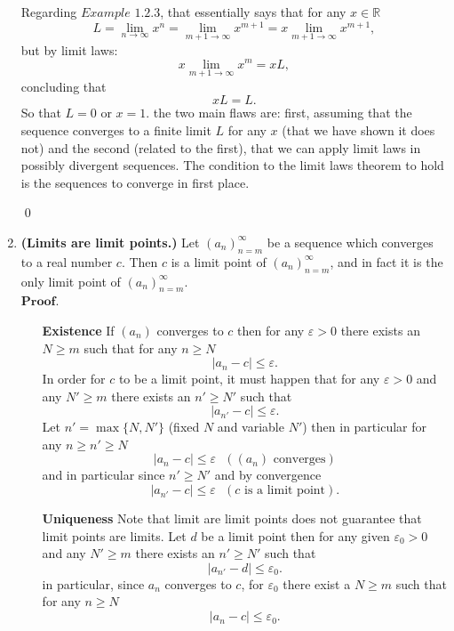 \documentclass{article}
\theoremstyle{remark}
\begin{document}
\begin{enumerate}
        Regarding $Example$ $1.2.3$, that essentially says that for any $x \in \mathbb{R}$
        \[
        L = \lim_{n\to\infty}x^n = \lim_{m+1\to\infty}x^{m+1} = x\lim_{m+1\to\infty}x^{m+1},
        \]
        but by limit laws:
        \[
        x\lim_{m+1\to\infty}x^{m} = xL,
        \]
        concluding that 
        \[
        xL = L.
        \]
        So that $L = 0$ or $x = 1$.
        the two main flaws are: 
        first, assuming that the sequence converges to a finite limit $L$ for any $x$ (that we have shown it does not)
        and the second (related to the first), that we can apply limit laws in possibly divergent sequences. The condition
        to the limit laws theorem to hold is the sequences to converge in first place.
        \begin{flushright}
            \qed
        \end{flushright}

        \item \textbf{(Limits are limit points.)}
        Let \((a_n)_{n=m}^{\infty}\) be a sequence which converges to a real number \(c\). Then \(c\) is a limit point of \((a_n)_{n=m}^{\infty}\), and in fact it is the only limit point of \((a_n)_{n=m}^{\infty}\).
        \\$\textbf{Proof.}$
        \begin{enumerate}
            \item[\textbf{Existence}]
            If $(a_n)$ converges to $c$ then for any $\varepsilon > 0$ there exists an $N \geq m$ such that for any $n \geq N$
            \[
            \vert a_n - c \vert \leq \varepsilon.
            \]
            In order for $c$ to be a limit point, it must happen that for any $\varepsilon > 0$
            and any $N' \geq m$ there exists an $n' \geq N'$ such that
            \[
            \vert a_{n'} - c \vert \leq \varepsilon.
            \]
            Let $n' = \max\{N,N'\}$ (fixed $N$ and variable $N'$) then in particular for any $n \geq n' \geq N$
            \[
            \vert a_n - c \vert \leq \varepsilon \text{ }( (a_n) \text{ converges})
            \]
            and in particular since $n' \geq N'$ and by convergence
            \[
            \vert a_{n'} - c \vert \leq \varepsilon \text{ }( c \text{ is a limit point}).
            \]
            \item[\textbf{Uniqueness}]
            Note that limit are limit points does not guarantee that limit points are limits.
            Let $d$ be a limit point then for any given $\varepsilon_0 > 0$ and any $N' \geq m$ 
            there exists an $n' \geq N'$ such that 
            \[
            \vert a_{n'} - d \vert \leq \varepsilon_0.
            \]
            in particular, since $a_n$ converges to $c$, for $\varepsilon_0$
            there exist a $N \geq m$ such that for any $n \geq N$
            \[
            \vert a_{n} - c \vert \leq \varepsilon_0. 
            \]
            

\end{enumerate}
\end{enumerate}
\end{document}
